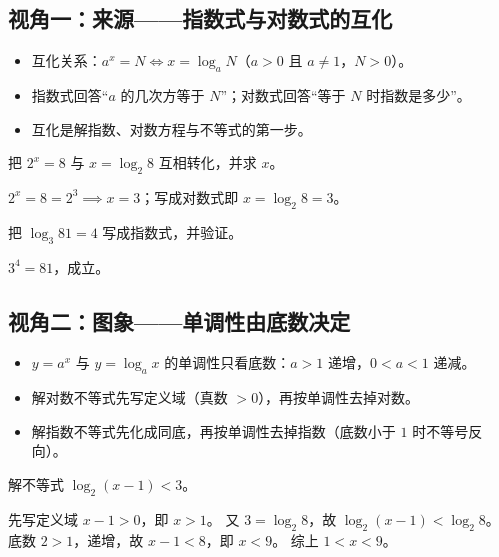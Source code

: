 \begin{explore}

\subsection{视角一：来源——指数式与对数式的互化}

\begin{itemize}
  \item 互化关系：$a^x=N\iff x=\log_a N$（$a>0$ 且 $a\neq1$，$N>0$）。
  \item 指数式回答“$a$ 的几次方等于 $N$”；对数式回答“等于 $N$ 时指数是多少”。
  \item 互化是解指数、对数方程与不等式的第一步。
\end{itemize}

\begin{example}
把 $2^x=8$ 与 $x=\log_2 8$ 互相转化，并求 $x$。
\end{example}
\begin{solution}
$2^x=8=2^3\implies x=3$；写成对数式即 $x=\log_2 8=3$。
\end{solution}

\begin{problem}
把 $\log_3 81=4$ 写成指数式，并验证。
\end{problem}
\begin{solution}
$3^4=81$，成立。
\end{solution}

\subsection{视角二：图象——单调性由底数决定}

\begin{itemize}
  \item $y=a^x$ 与 $y=\log_a x$ 的单调性只看底数：$a>1$ 递增，$0<a<1$ 递减。
  \item 解对数不等式先写定义域（真数 $>0$），再按单调性去掉对数。
  \item 解指数不等式先化成同底，再按单调性去掉指数（底数小于 $1$ 时不等号反向）。
\end{itemize}

\begin{example}
解不等式 $\log_2(x-1)<3$。
\end{example}
\begin{solution}
先写定义域 $x-1>0$，即 $x>1$。
又 $3=\log_2 8$，故 $\log_2(x-1)<\log_2 8$。
底数 $2>1$，递增，故 $x-1<8$，即 $x<9$。
综上 $1<x<9$。
\end{solution}


\end{explore}
